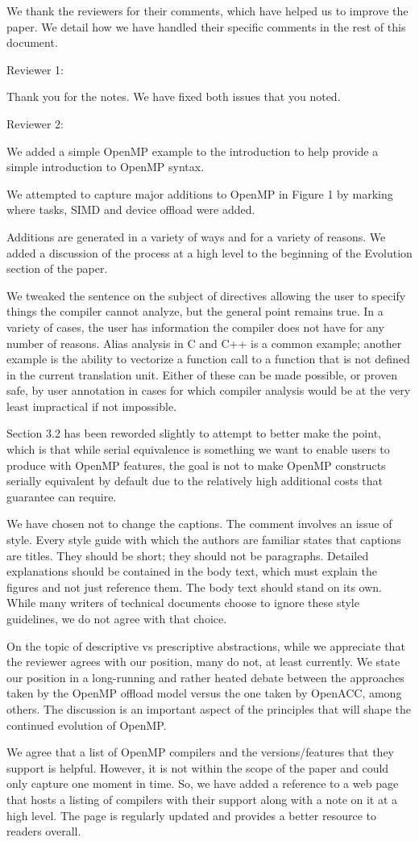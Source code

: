 \documentclass[]{article}
\date{}
\begin{document}
We thank the reviewers for their comments, which have helped us to
improve the paper. We detail how we have handled their specific comments
in the rest of this document.

Reviewer 1:

Thank you for the notes. We have fixed both issues that you noted.

Reviewer 2:

We added a simple OpenMP example to the introduction to help
provide a simple introduction to OpenMP syntax.

We attempted to capture major additions to OpenMP in Figure 1 by marking
where tasks, SIMD and device offload were added.

Additions are generated in a variety of ways and for a variety of
reasons. We added a discussion of the process at a high level to the
beginning of the Evolution section of the paper.

We tweaked the sentence on the subject of directives allowing the user
to specify things the compiler cannot analyze, but the general point
remains true. In a variety of cases, the user has information the
compiler does not have for any number of reasons. Alias analysis in C
and C++ is a common example; another example is the ability to vectorize
a function call to a function that is not defined in the current
translation unit. Either of these can be made possible, or proven safe,
by user annotation in cases for which compiler analysis would be at the
very least impractical if not impossible.

Section 3.2 has been reworded slightly to attempt to better make the
point, which is that while serial equivalence is something we want to
enable users to produce with OpenMP features, the goal is not to make
OpenMP constructs serially equivalent by default due to the relatively
high additional costs that guarantee can require.

We have chosen not to change the captions. The comment involves an issue
of style. Every style guide with which the authors are familiar states
that captions are titles. They should be short; they should not be
paragraphs. Detailed explanations should be contained in the body text,
which must explain the figures and not just reference them. The body
text should stand on its own. While many writers of technical documents
choose to ignore these style guidelines, we do not agree with that
choice.

On the topic of descriptive vs prescriptive abstractions, while we
appreciate that the reviewer agrees with our position, many do not, at
least currently. We state our position in a long-running and rather
heated debate between the approaches taken by the OpenMP offload model
versus the one taken by OpenACC, among others. The discussion is an
important aspect of the principles that will shape the continued
evolution of OpenMP.

We agree that a list of OpenMP compilers and the versions/features that
they support is helpful. However, it is not within the scope of the
paper and could only capture one moment in time. So, we have added a
reference to a web page that hosts a listing of compilers with their
support along with a note on it at a high level. The page is regularly
updated and provides a better resource to readers overall.
\end{document}
